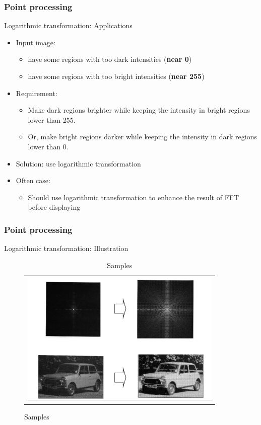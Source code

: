 \documentclass[english,11pt,table,handout]{beamer}
\begin{document}
\begin{frame}[fragile]
\frametitle{Point processing}

\begin{block}{Logarithmic transformation: Applications}
	\begin{itemize}
		\item Input image: 
		\begin{itemize}
			\item have some regions with too dark intensities (\textbf{near 0})
			\item have some regions with too bright intensities (\textbf{near 255})
		\end{itemize}
	
		\item Requirement:
		\begin{itemize}
			\item Make dark regions brighter while keeping the intensity in bright regions lower than 255.
			\item Or, make bright regions darker while keeping the intensity in dark regions lower than 0.
		\end{itemize}
		\item Solution: use logarithmic transformation
		\item Often case:
		\begin{itemize}
			\item Should use logarithmic transformation to enhance the result of FFT before displaying
		\end{itemize}
			
	\end{itemize}
\end{block}
\end{frame}



\begin{frame}[fragile]
\frametitle{Point processing}
\begin{block}{Logarithmic transformation: Illustration}
	\begin{figure}[!h]
		\begin{table}
			\begin{tabular}{c}
				\includegraphics[height=6.5cm]{./images/log_trans.png}
				
			\end{tabular}
			\caption{Samples}
		\end{table}
	\end{figure}	
\end{block}
\end{frame}
\end{document}
